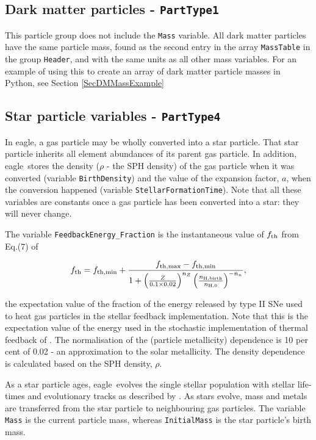 \documentclass[10pt, a4paper]{article}
\newcommand{\eagle}{{\sc eagle}}
\begin{document}
\subsection{Dark matter particles - \texttt{PartType1}}
This particle group does not include the \texttt{Mass} variable. All dark
matter particles have the same particle mass, found as the second entry in the
array \texttt{MassTable} in the group \texttt{Header}, and with the same units
as all other mass variables. For an example of using this to create an array of
dark matter particle masses in {\sc Python}, see Section
\ref{SecDMMassExample}

\subsection{Star particle variables - \texttt{PartType4}}
\label{SecFeedback}
In \eagle, a gas particle may be wholly converted into a star particle. That
star particle inherits all element abundances of its parent gas particle. In
addition, \eagle\ stores the density ($\rho$ - the SPH density) of the gas
particle when it was converted (variable \texttt{BirthDensity}) and the value
of the expansion factor, $a$, when the conversion happened (variable
\texttt{StellarFormationTime}). Note that all these variables are constants
once a gas particle has been converted into a star: they will never change.

The variable \texttt{FeedbackEnergy\_Fraction} is the instantaneous value of
$f_{\rm th}$ from Eq.(7) of \cite{2015MNRAS.446..521S}

\begin{equation}
f_{\rm th} = f_{\rm th,min} + \frac{f_{\rm th,max} - f_{\rm th,min}}
{1 + \left (\frac{Z}{0.1\times 0.02}\right )^{n_Z} \left (\frac{n_{\rm H,birth}}{n_{{\rm H},0}}\right )^{-n_n}},
\label{EqfZn}
\end{equation} 

\noindent the expectation value of the fraction of the energy released by
type II SNe used to heat gas particles in the stellar feedback implementation.
Note that this is the expectation value of the energy used in the stochastic
implementation of thermal feedback of \cite{2012MNRAS.426..140D}. The
normalisation of the (particle metallicity) dependence is 10 per cent of 0.02 -
an approximation to the solar metallicity. The density dependence is calculated
based on the SPH density, $\rho$.

As a star particle ages, \eagle\ evolves the single stellar population with
stellar life-times and evolutionary tracks as described by \cite{2009MNRAS.399..574W}.
As stars evolve, mass and metals are transferred from the star particle to
neighbouring gas particles. The variable \texttt{Mass} is the current particle
mass, whereas \texttt{InitialMass} is the star particle's birth mass.
\end{document}
